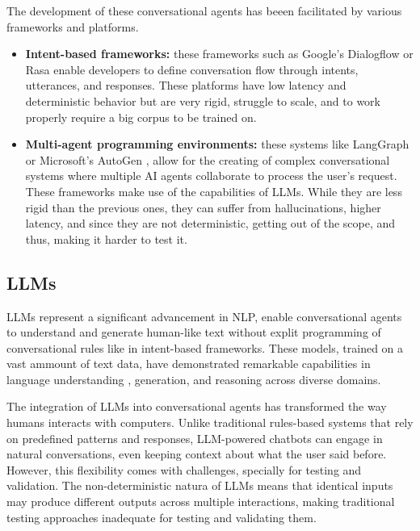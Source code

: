 The development of these conversational agents
has beeen facilitated by various frameworks and platforms.
\begin{itemize}
  \item \textbf{Intent-based frameworks:}
    these frameworks such as Google's Dialogflow \autocite{Dialogflow} or Rasa \autocite{Rasa2020}
    enable developers to define conversation flow through intents, utterances, and responses.
    These platforms have low latency and deterministic behavior
    but are very rigid, struggle to scale,
    and to work properly require a big corpus to be trained on.

  \item \textbf{Multi-agent programming environments:}
    these systems like LangGraph \autocite{LangGraph} or Microsoft's AutoGen \autocite{AutoGen},
    allow for the creating of complex conversational systems
    where multiple \ac{AI} agents collaborate to process the user's request.
    These frameworks make use of the capabilities of \acp{LLM}.
    While they are less rigid than the previous ones,
    they can suffer from hallucinations, 
    higher latency, and since they are not deterministic,
    getting out of the scope, and thus, making it harder to test it.
\end{itemize}

\subsection{\aclp{LLM}}

\aclp{LLM} represent a significant advancement in \acl{NLP},
enable conversational agents to understand and generate human-like text
without explit programming of conversational rules like in intent-based frameworks.
These models, trained on a vast ammount of text data,
have demonstrated remarkable capabilities in
language understanding \autocite{liEnhancingNaturalLanguage2024}, generation, and reasoning across diverse domains.

The integration of \acp{LLM} into conversational agents
has transformed the way humans interacts with computers.
Unlike traditional rules-based systems that rely on predefined patterns and responses,
\ac{LLM}-powered chatbots can engage in natural conversations,
even keeping context about what the user said before.
However, this flexibility comes with challenges,
specially for testing and validation.
The non-deterministic natura of \acp{LLM} means that
identical inputs may produce different outputs across multiple interactions,
making traditional testing approaches inadequate for testing and validating them.

